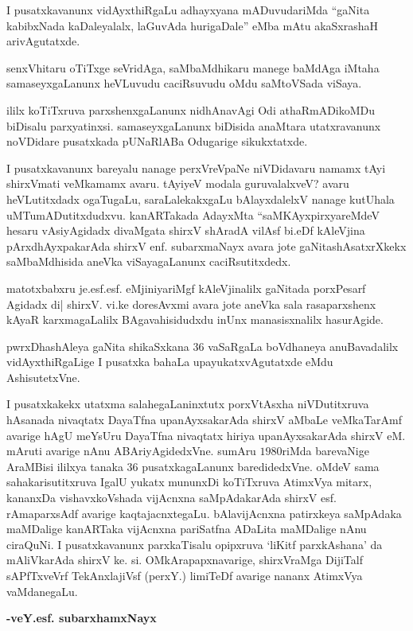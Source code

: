 { I pusatxkavanunx vidAyxthiRgaLu adhayxyana mADuvudariMda ``gaNita kabibxNada kaDaleyalalx, laGuvAda hurigaDale'' eMba mAtu akaSxrashaH arivAgutatxde.

 senxVhitaru oTiTxge seVridAga, saMbaMdhikaru manege baMdAga iMtaha samaseyxgaLanunx heVLuvudu caciRsuvudu oMdu saMtoVSada viSaya.

\eject

  ililx koTiTxruva parxshenxgaLanunx nidhAnavAgi Odi athaRmADikoMDu biDisalu parxyatinxsi. samaseyxgaLanunx biDisida anaMtara utatxravanunx noVDidare pusatxkada pUNaRlABa Odugarige sikukxtatxde.

 I pusatxkavanunx bareyalu nanage perxVreVpaNe niVDidavaru namamx tAyi shirxVmati veMkamamx avaru. tAyiyeV modala guruvalalxveV? avaru heVLutitxdadx ogaTugaLu, saraLalekakxgaLu bAlayxdalelxV nanage kutUhala uMTumADutitxdudxvu. kanARTakada AdayxMta ``saMKAyxpirxyareMdeV hesaru vAsiyAgidadx divaMgata shirxV shAradA vilAsf bi.eDf kAleVjina pArxdhAyxpakarAda shirxV enf. subarxmaNayx avara jote gaNitashAsatxrXkekx saMbaMdhisida aneVka viSayagaLanunx caciRsutitxdedx.

 matotxbabxru je.esf.esf. eMjiniyariMgf kAleVjinalilx gaNitada porxPesarf Agidadx di| shirxV. vi.ke doresAvxmi avara jote aneVka sala rasaparxshenx kAyaR karxmagaLalilx BAgavahisidudxdu inUnx manasisxnalilx hasurAgide.

 pwrxDhashAleya gaNita shikaSxkana $36$ vaSaRgaLa boVdhaneya anuBavadalilx vidAyxthiRgaLige I pusatxka bahaLa upayukatxvAgutatxde eMdu AshisutetxVne.

 I pusatxkakekx utatxma salahegaLaninxtutx porxVtAsxha niVDutitxruva hAsanada nivaqtatx DayaTfna upanAyxsakarAda shirxV aMbaLe veMkaTarAmf avarige hAgU meYsUru DayaTfna nivaqtatx hiriya upanAyxsakarAda shirxV eM. mAruti avarige nAnu ABAriyAgidedxVne. sumAru $1980$riMda barevaNige AraMBisi ililxya tanaka $36$ pusatxkagaLanunx baredidedxVne. oMdeV sama sahakarisutitxruva IgalU yukatx mununxDi koTiTxruva AtimxVya mitarx, kananxDa vishavxkoVshada vijAcnxna saMpAdakarAda shirxV esf. rAmaparxsAdf avarige kaqtajacnxtegaLu. bAlavijAcnxna patirxkeya saMpAdaka maMDalige kanARTaka vijAcnxna pariSatfna ADaLita maMDalige nAnu ciraQuNi. I pusatxkavanunx parxkaTisalu opipxruva `liKitf parxkAshana' da mAliVkarAda shirxV ke. si. OMkArapapxnavarige, shirxVraMga DijiTalf sAPfTxveVrf TekAnxlajiVsf (perxY.) limiTeDf avarige nananx AtimxVya vaMdanegaLu.

\begin{flushright}
 \hfill{\bf -veY.esf. subarxhamxNayx}\hfill\\
 \end{flushright}
}
